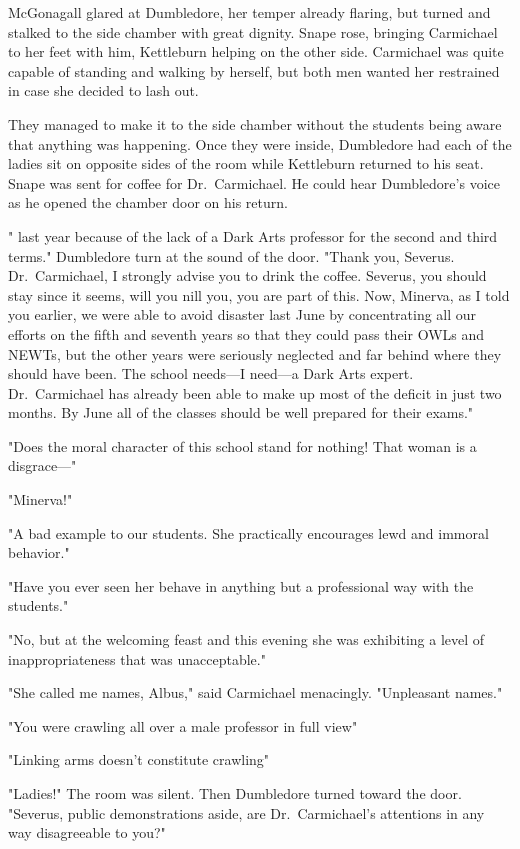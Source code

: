 McGonagall glared at Dumbledore, her temper already flaring, but turned and stalked to the side chamber with great dignity. Snape rose, bringing Carmichael to her feet with him, Kettleburn helping on the other side. Carmichael was quite capable of standing and walking by herself, but both men wanted her restrained in case she decided to lash out.

They managed to make it to the side chamber without the students being aware that anything was happening. Once they were inside, Dumbledore had each of the ladies sit on opposite sides of the room while Kettleburn returned to his seat. Snape was sent for coffee for Dr.~Carmichael. He could hear Dumbledore's voice as he opened the chamber door on his return.

"{\el} last year because of the lack of a Dark Arts professor for the second and third terms." Dumbledore turn at the sound of the door. "Thank you, Severus. Dr.~Carmichael, I strongly advise you to drink the coffee. Severus, you should stay since it seems, will you nill you, you are part of this. Now, Minerva, as I told you earlier, we were able to avoid disaster last June by concentrating all our efforts on the fifth and seventh years so that they could pass their OWLs and NEWTs, but the other years were seriously neglected and far behind where they should have been. The school needs—I need—a Dark Arts expert. Dr.~Carmichael has already been able to make up most of the deficit in just two months. By June all of the classes should be well prepared for their exams."

"Does the moral character of this school stand for nothing! That woman is a disgrace—"

"Minerva!"

"A bad example to our students. She practically encourages lewd and immoral behavior."

"Have you ever seen her behave in anything but a professional way with the students."

"No, but at the welcoming feast and this evening she was exhibiting a level of inappropriateness that was unacceptable."

"She called me names, Albus," said Carmichael menacingly. "Unpleasant names."

"You were crawling all over a male professor in full view{\el}"

"Linking arms doesn't constitute crawling{\el}"

"Ladies!" The room was silent. Then Dumbledore turned toward the door. "Severus, public demonstrations aside, are Dr.~Carmichael's attentions in any way disagreeable to you?"

